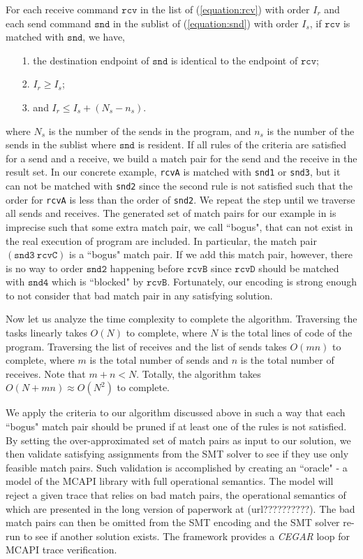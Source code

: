 For each receive command $\mathtt{rcv}$ in the list of (\ref{equation:rcv}) with order $I_r$ and each send command $\mathtt{snd}$ in the sublist of (\ref{equation:snd}) with order $I_s$, if $\mathtt{rcv}$ is matched with $\mathtt{snd}$, we have,
\begin{itemize}
\item[1.] the destination endpoint of $\mathtt{snd}$ is identical to the endpoint of $\mathtt{rcv}$;
\item[2.] $I_r \geq I_s$;
\item[3.] and $I_r \leq I_s + (N_s - n_s)$.
\end{itemize}
where $N_s$ is the number of the sends in the program, and $n_s$ is the number of the sends in the sublist where $\mathtt{snd}$ is resident. If all rules of the criteria are satisfied for a send and a receive, we build a match pair for the send and the receive in the result set. In our concrete example, \texttt{rcvA} is matched with \texttt{snd1} or \texttt{snd3}, but it can not be matched with \texttt{snd2} since the second rule is not satisfied such that the order for \texttt{rcvA} is less than the order of \texttt{snd2}. We repeat the step until we traverse all sends and receives. The generated set of match pairs for our example in  is imprecise such that some extra match pair, we call ``bogus", that can not exist in the real execution of program are included. In particular, the match pair $(\mathtt{snd3}\ \mathtt{rcvC})$ is a ``bogus" match pair. If we add this match pair, however, there is no way to order $\mathtt{snd2}$ happening before $\mathtt{rcvB}$ since $\mathtt{rcvD}$ should be matched with $\mathtt{snd4}$ which is ``blocked" by $\mathtt{rcvB}$. Fortunately, our encoding is strong enough to not consider that bad match pair in any satisfying solution.


Now let us analyze the time complexity to complete the algorithm. Traversing the tasks linearly takes $O(N)$ to complete, where $N$ is the total lines of code of the program. Traversing the list of receives and the list of sends takes $O(mn)$ to complete, where $m$ is the total number of sends and $n$ is the total number of receives. Note that $m + n < N$. Totally, the algorithm takes $O(N + mn) \approx O(N^2)$ to complete.

We apply the criteria to our algorithm discussed above in such a way that each ``bogus" match pair should be pruned if at least one of the rules is not satisfied. By setting the over-approximated set of match pairs as input to our solution, we then validate satisfying assignments from the SMT solver to see if they use only feasible match pairs. Such validation is accomplished by creating an ``oracle" - a model of the MCAPI library with full operational semantics. The model will reject a given trace that relies on bad match pairs, the operational semantics of which are presented in the long version of paperwork at (url??????????). The bad match pairs can then be omitted from the SMT encoding and the SMT solver re-run to see if another solution exists. The framework provides a \textit{CEGAR} loop for MCAPI trace verification.
